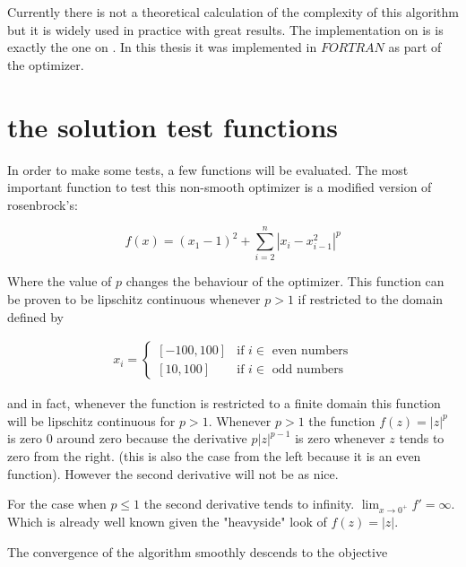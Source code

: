 Currently there is not a theoretical calculation of the complexity of this algorithm but it is widely used in practice with great results. The implementation on \citep{skaaja} is is exactly the one on \citep{nocedal}. In this thesis it was implemented in $FORTRAN$ as part of the optimizer.

\chapter{the solution test functions}

In order to make some tests, a few functions will be evaluated. The most important function to test this non-smooth optimizer is a modified version of rosenbrock's:

\begin{equation}
    f(x) = (x_1 - 1)^2 + \sum_{i = 2}^n |x_i - x_{i - 1}^2|^p
\end{equation}

Where the value of $p$ changes the behaviour of the optimizer. This function can be proven to be lipschitz continuous whenever $p > 1$ if restricted to the domain defined by  

\begin{equation}
  \begin{aligned}
    x_i = 
    \begin{cases}
      [-100, 100] & \text{if } i \in \text{ even numbers} \\
      [10, 100] & \text{if } i \in \text{ odd numbers}
    \end{cases}
  \end{aligned}
\end{equation}

and in fact, whenever the function is restricted to a finite domain this function will be lipschitz continuous for $p > 1$. Whenever $p > 1$ the function $f(z) = |z|^p$ is zero $0$ around zero because the derivative $p |z| ^{p-1}$ is zero whenever $z$ tends to zero from the right. (this is also the case from the left because it is an even function). However the second derivative will not be as nice.

For the case when $p \leq 1$ the second derivative tends to infinity. $\displaystyle \lim_{x \to 0^+} {f' = \infty}$. Which is already well known given the "heavyside" look of $f(z) = |z|$.

The convergence of the algorithm smoothly descends to the objective 

